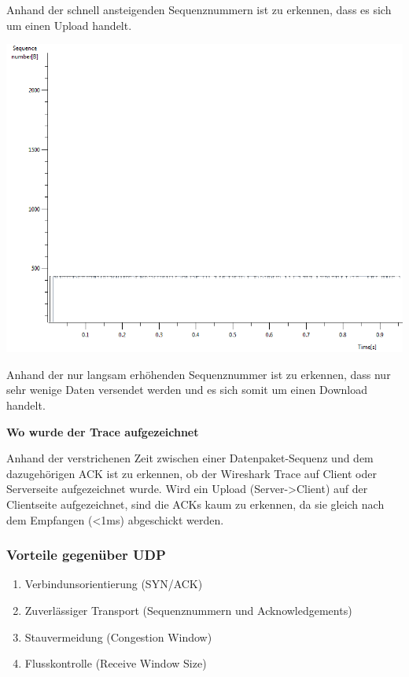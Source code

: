 Anhand der schnell ansteigenden Sequenznummern ist zu erkennen, dass es sich um
einen Upload handelt.

\includegraphics[scale=0.45]{media/tcptraceDownload.png}

Anhand der nur langsam erhöhenden Sequenznummer ist zu erkennen, dass nur sehr
wenige Daten versendet werden und es sich somit um einen Download handelt.

\textbf{Wo wurde der Trace aufgezeichnet}

Anhand der verstrichenen Zeit zwischen einer Datenpaket-Sequenz und dem
dazugehörigen ACK ist zu erkennen, ob der Wireshark Trace auf Client oder
Serverseite aufgezeichnet wurde. Wird ein Upload (Server->Client) auf der
Clientseite aufgezeichnet, sind die ACKs kaum zu erkennen, da sie gleich nach
dem Empfangen (<1ms) abgeschickt werden.

\subsubsection{Vorteile gegenüber UDP}

\begin{enumerate}
	\item Verbindunsorientierung (SYN/ACK)
	\item Zuverlässiger Transport (Sequenznummern und Acknowledgements)
	\item Stauvermeidung (Congestion Window)
	\item Flusskontrolle (Receive Window Size)
\end{enumerate}


